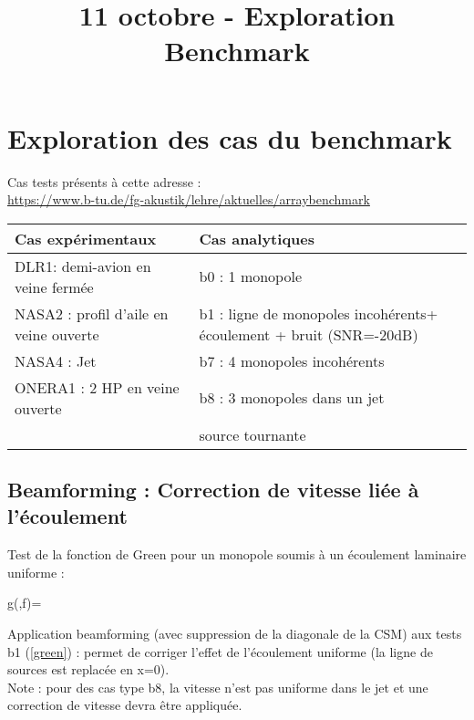 \documentclass[twocolumn, 11pt, landscape]{article}
\title{\vspace{-12mm}\fontsize{14pt}{14pt}\selectfont\textbf{11 octobre - Exploration Benchmark}} %
\date{\vspace{-1cm}
}
\renewenvironment{equation}{\vspace{-0.2cm}\begin{oldequation}}{\vspace{-0.2cm}\end{oldequation}}
\begin{document}
\maketitle %

\section{Exploration des cas du benchmark}

Cas tests présents à cette adresse :\\
 \url{https://www.b-tu.de/fg-akustik/lehre/aktuelles/arraybenchmark}

\begin{tabular}{p{} | p{}}

Cas expérimentaux & Cas analytiques \\\hline
DLR1: demi-avion en veine fermée & b0 : 1 monopole \\
NASA2 : profil d'aile en veine ouverte & b1 : ligne de monopoles incohérents\newline + écoulement + bruit (SNR=-20dB)\\
NASA4 : Jet & b7 : 4 monopoles incohérents \\
ONERA1 : 2 HP en veine ouverte & b8 : 3 monopoles dans un jet \\
 &  source tournante
\end{tabular}

\subsection{Beamforming : Correction de vitesse liée à l'écoulement}

Test de la fonction de Green pour un monopole soumis à un écoulement laminaire uniforme : 
\begin{equation}
	g(,f)=
\end{equation}

Application beamforming (avec suppression de la diagonale de la CSM) aux tests b1 (\ref{green}) : permet de corriger l'effet de l'écoulement uniforme (la ligne de sources est replacée en x=0).\\
Note : pour des cas type b8, la vitesse n'est pas uniforme dans le jet et une correction de vitesse devra être appliquée.
\end{document}
